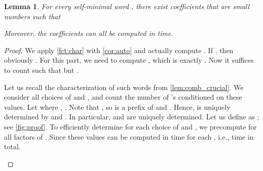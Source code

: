 \documentclass{article}
\newtheorem{lemma}[theorem]{Lemma}
\theoremstyle{definition}
\theoremstyle{remark}
\begin{document}
\begin{lemma}\label{lem:cs}
  For every self-minimal word , there exist coefficients  that are small numbers such that
  
  Moreover, the coefficients  can all be computed in  time.
\end{lemma}
\begin{proof}
  We apply \cref{fct:char} with \cref{cor:auto} and actually compute
  .
  If , then obviously .
  For this part, we need to compute , which is exactly .
  Now it suffices to count  such that  but .

  Let us recall the characterization of such words from \cref{lem:comb_crucial}.
  We consider all  choices of  and ,
  and count the number of 's conditioned on these values.
  Let  where , .
  Note that , so  is a prefix  of 
  and .
  Hence,  is uniquely determined by  and .
  In particular,  and  are uniquely determined.
  Let us define  as ;
see \cref{fig:proof}.
  To efficiently determine  for each choice of  and , we precompute  for all factors  of .
  Since  these values can be computed in  time for each ,
  i.e.,  time in total.

\begin{figure}[htpb]
\end{figure}
\end{proof}
\end{document}
